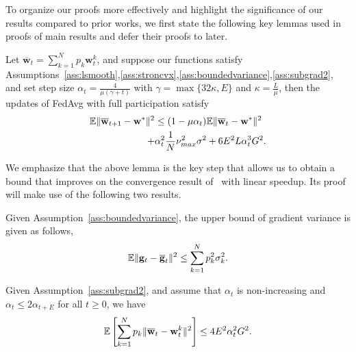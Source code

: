 
To organize our proofs more effectively and highlight the significance of our results compared to prior works, 
we first state the following key lemmas used in proofs of main results and defer their proofs to later. 
\begin{lemma} Let $\overline{\mathbf{w}}_{t}=\sum_{k=1}^{N}p_{k}\mathbf{w}_{t}^{k}$, and
suppose our functions satisfy Assumptions~\ref{ass:lsmooth},\ref{ass:stroncvx},\ref{ass:boundedvariance},\ref{ass:subgrad2}, and set step size $\alpha_{t}=\frac{4}{\mu(\gamma+t)}$
	with $\gamma=\max\{32\kappa,E\}$ and $\kappa=\frac{L}{\mu}$, then the updates of FedAvg with full participation satisfy
	\begin{align*}
	\mathbb{E}\|{\overline{\mathbf{w}}}_{t+1}-{\mathbf{w}}^{\ast}\|^{2} & \leq(1-\mu\alpha_{t})\mathbb{E}\|{\overline{\mathbf{w}}}_{t}-{\mathbf{w}}^{\ast}\|^{2}\\
	+& \alpha_{t}^{2}\frac{1}{N}\nu_{max}^{2}\sigma^{2}+6E^{2}L\alpha_{t}^{3}G^{2}.
	\end{align*}
\label{lem:scvxoner}
\end{lemma}
We emphasize that the above lemma is the key step that allows us to obtain a bound that improves on the convergence result of~\cite{li2019convergence} with linear speedup. Its proof will make use of the following two results. 
\begin{lemma}
Given Assumption~\ref{ass:boundedvariance}, the upper bound of gradient variance is given as follows,
\begin{align*}
	\mathbb{E}\|{\mathbf{g}}_{t}-{\overline{\mathbf{g}}}_{t}\|^{2} \leq \sum_{k=1}^{N}p_{k}^{2}\sigma_{k}^{2}.
	\end{align*}
\label{lem:bgv}
\end{lemma}

\begin{lemma}
Given Assumption~\ref{ass:subgrad2}, and assume that $\alpha_t$ is non-increasing and $\alpha_t \leq 2\alpha_{t+E}$ for all $t\geq 0$, we have
	\begin{align*}
	\mathbb{E}\left[\sum_{k=1}^{N}p_{k}\|{\overline{\mathbf{w}}}_{t}-{\mathbf{w}}_{t}^{k}\|^{2} \right]\leq 4E^{2}\alpha_{t}^{2}G^{2}.
	\end{align*}
\label{lem:bdw}
\end{lemma}

